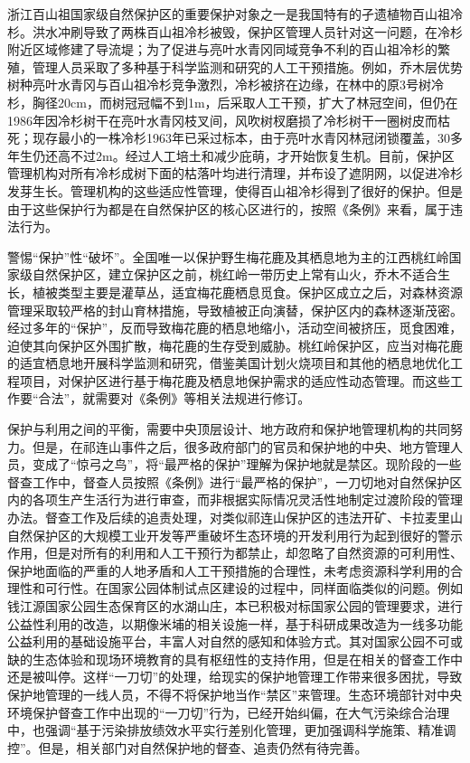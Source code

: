 \documentclass[
]{book}
\begin{document}
浙江百山祖国家级自然保护区的重要保护对象之一是我国特有的孑遗植物百山祖冷杉。洪水冲刷导致了两株百山祖冷杉被毁，保护区管理人员针对这一问题，在冷杉附近区域修建了导流堤；为了促进与亮叶水青冈同域竞争不利的百山祖冷杉的繁殖，管理人员采取了多种基于科学监测和研究的人工干预措施。例如，乔木层优势树种亮叶水青冈与百山祖冷杉竞争激烈，冷杉被挤在边缘，在林中的原3号树冷杉，胸径20cm，而树冠冠幅不到1m，后采取人工干预，扩大了林冠空间，但仍在1986年因冷杉树干在亮叶水青冈枝叉间，风吹树杈磨损了冷杉树干一圈树皮而枯死；现存最小的一株冷杉1963年已采过标本，由于亮叶水青冈林冠闭锁覆盖，30多年生仍还高不过2m。经过人工培土和减少庇萌，才开始恢复生机。目前，保护区管理机构对所有冷杉成树下面的枯落叶均进行清理，并布设了遮阴网，以促进冷杉发芽生长。管理机构的这些适应性管理，使得百山祖冷杉得到了很好的保护。但是由于这些保护行为都是在自然保护区的核心区进行的，按照《条例》来看，属于违法行为。

警惕``保护''性``破坏''。全国唯一以保护野生梅花鹿及其栖息地为主的江西桃红岭国家级自然保护区，建立保护区之前，桃红岭一带历史上常有山火，乔木不适合生长，植被类型主要是灌草丛，适宜梅花鹿栖息觅食。保护区成立之后，对森林资源管理采取较严格的封山育林措施，导致植被正向演替，保护区内的森林逐渐茂密。经过多年的``保护''，反而导致梅花鹿的栖息地缩小，活动空间被挤压，觅食困难，迫使其向保护区外围扩散，梅花鹿的生存受到威胁。桃红岭保护区，应当对梅花鹿的适宜栖息地开展科学监测和研究，借鉴美国计划火烧项目和其他的栖息地优化工程项目，对保护区进行基于梅花鹿及栖息地保护需求的适应性动态管理。而这些工作要``合法''，就需要对《条例》等相关法规进行修订。

保护与利用之间的平衡，需要中央顶层设计、地方政府和保护地管理机构的共同努力。但是，在祁连山事件之后，很多政府部门的官员和保护地的中央、地方管理人员，变成了``惊弓之鸟''，将``最严格的保护''理解为保护地就是禁区。现阶段的一些督查工作中，督查人员按照《条例》进行``最严格的保护''，一刀切地对自然保护区内的各项生产生活行为进行审查，而非根据实际情况灵活性地制定过渡阶段的管理办法。督查工作及后续的追责处理，对类似祁连山保护区的违法开矿、卡拉麦里山自然保护区的大规模工业开发等严重破坏生态环境的开发利用行为起到很好的警示作用，但是对所有的利用和人工干预行为都禁止，却忽略了自然资源的可利用性、保护地面临的严重的人地矛盾和人工干预措施的合理性，未考虑资源科学利用的合理性和可行性。在国家公园体制试点区建设的过程中，同样面临类似的问题。例如钱江源国家公园生态保育区的水湖山庄，本已积极对标国家公园的管理要求，进行公益性利用的改造，以期像米埔的相关设施一样，基于科研成果改造为一线多功能公益利用的基础设施平台，丰富人对自然的感知和体验方式。其对国家公园不可或缺的生态体验和现场环境教育的具有枢纽性的支持作用，但是在相关的督查工作中还是被叫停。这样``一刀切''的处理，给现实的保护地管理工作带来很多困扰，导致保护地管理的一线人员，不得不将保护地当作``禁区''来管理。生态环境部针对中央环境保护督查工作中出现的``一刀切''行为，已经开始纠偏，在大气污染综合治理中，也强调``基于污染排放绩效水平实行差别化管理，更加强调科学施策、精准调控''。但是，相关部门对自然保护地的督查、追责仍然有待完善。
\end{document}
